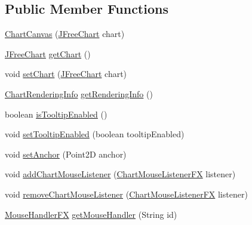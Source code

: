 \subsection*{Public Member Functions}
\begin{DoxyCompactItemize}
\item 
\mbox{\hyperlink{classorg_1_1jfree_1_1chart_1_1fx_1_1_chart_canvas_a64f73ef4f6721f456f707e33b37bd971}{Chart\+Canvas}} (\mbox{\hyperlink{classorg_1_1jfree_1_1chart_1_1_j_free_chart}{J\+Free\+Chart}} chart)
\item 
\mbox{\hyperlink{classorg_1_1jfree_1_1chart_1_1_j_free_chart}{J\+Free\+Chart}} \mbox{\hyperlink{classorg_1_1jfree_1_1chart_1_1fx_1_1_chart_canvas_a65ae101a6345770ad9322c5cafe47881}{get\+Chart}} ()
\item 
void \mbox{\hyperlink{classorg_1_1jfree_1_1chart_1_1fx_1_1_chart_canvas_a7afcaa5e64560f44d596df90233afaaf}{set\+Chart}} (\mbox{\hyperlink{classorg_1_1jfree_1_1chart_1_1_j_free_chart}{J\+Free\+Chart}} chart)
\item 
\mbox{\hyperlink{classorg_1_1jfree_1_1chart_1_1_chart_rendering_info}{Chart\+Rendering\+Info}} \mbox{\hyperlink{classorg_1_1jfree_1_1chart_1_1fx_1_1_chart_canvas_ad6f987f516ea5f7b3cff5e3b7d9e47ae}{get\+Rendering\+Info}} ()
\item 
boolean \mbox{\hyperlink{classorg_1_1jfree_1_1chart_1_1fx_1_1_chart_canvas_aba94980f62e5c0f9d7b2739ddfa6c766}{is\+Tooltip\+Enabled}} ()
\item 
void \mbox{\hyperlink{classorg_1_1jfree_1_1chart_1_1fx_1_1_chart_canvas_aed9ae0c3a6f1d211e25508b987e53b73}{set\+Tooltip\+Enabled}} (boolean tooltip\+Enabled)
\item 
void \mbox{\hyperlink{classorg_1_1jfree_1_1chart_1_1fx_1_1_chart_canvas_a670e346dcc9c53b3e4eced8d091769c5}{set\+Anchor}} (Point2D anchor)
\item 
void \mbox{\hyperlink{classorg_1_1jfree_1_1chart_1_1fx_1_1_chart_canvas_a15e8f2e9327531eec5415480bc6ecc69}{add\+Chart\+Mouse\+Listener}} (\mbox{\hyperlink{interfaceorg_1_1jfree_1_1chart_1_1fx_1_1interaction_1_1_chart_mouse_listener_f_x}{Chart\+Mouse\+Listener\+FX}} listener)
\item 
void \mbox{\hyperlink{classorg_1_1jfree_1_1chart_1_1fx_1_1_chart_canvas_a0d2b10e5af6a54e696b1810892b8fb64}{remove\+Chart\+Mouse\+Listener}} (\mbox{\hyperlink{interfaceorg_1_1jfree_1_1chart_1_1fx_1_1interaction_1_1_chart_mouse_listener_f_x}{Chart\+Mouse\+Listener\+FX}} listener)
\item 
\mbox{\hyperlink{interfaceorg_1_1jfree_1_1chart_1_1fx_1_1interaction_1_1_mouse_handler_f_x}{Mouse\+Handler\+FX}} \mbox{\hyperlink{classorg_1_1jfree_1_1chart_1_1fx_1_1_chart_canvas_a33d9ead3f1750b2d4499c661950084cb}{get\+Mouse\+Handler}} (String id)

\end{DoxyCompactItemize}
